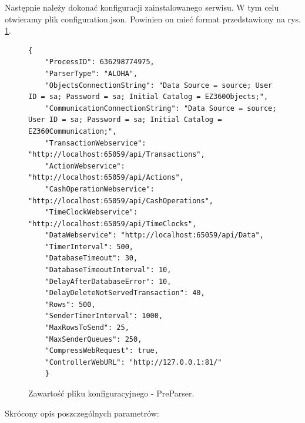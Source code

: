 \documentclass[a4paper]{book}
\begin{document}
Następnie należy dokonać konfiguracji zainstalowanego serwisu. W tym celu otwieramy plik configuration.json. Powinien on mieć format przedstawiony na rys. \ref{lst:przykladowyPlikKonfiguracyjnyPreParser}.
\begin{figure}[t]
	\begin{lstlisting}[frame=single, breaklines=true]
	{
	"ProcessID": 636298774975,
	"ParserType": "ALOHA",
	"ObjectsConnectionString": "Data Source = source; User ID = sa; Password = sa; Initial Catalog = EZ360Objects;",
	"CommunicationConnectionString": "Data Source = source; User ID = sa; Password = sa; Initial Catalog = EZ360Communication;",
	"TransactionWebservice": "http://localhost:65059/api/Transactions",
	"ActionWebservice": "http://localhost:65059/api/Actions",
	"CashOperationWebservice": "http://localhost:65059/api/CashOperations",
	"TimeClockWebservice": "http://localhost:65059/api/TimeClocks",
	"DataWebservice": "http://localhost:65059/api/Data",
	"TimerInterval": 500,
	"DatabaseTimeout": 30,
	"DatabaseTimeoutInterval": 10,
	"DelayAfterDatabaseError": 10,
	"DelayDeleteNotServedTransaction": 40,
	"Rows": 500,
	"SenderTimerInterval": 1000,
	"MaxRowsToSend": 25,
	"MaxSenderQueues": 250,
	"CompressWebRequest": true,
	"ControllerWebURL": "http://127.0.0.1:81/"
	}
	\end{lstlisting}
	\caption{Zawartość pliku konfiguracyjnego - PreParser.}
	\label{lst:przykladowyPlikKonfiguracyjnyPreParser}
\end{figure}
Skrócony opis poszczególnych parametrów:
\end{document}
